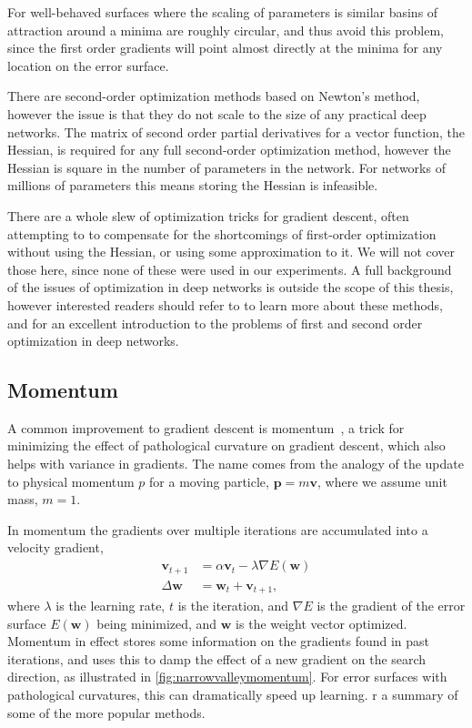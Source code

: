 \documentclass[thesis]{subfiles}
\begin{document}
For well-behaved surfaces where the scaling of parameters is similar
basins of attraction around a minima are roughly circular, and thus avoid this problem, since the first order gradients will point almost directly at the minima for any location on the error surface.

There are second-order optimization methods based on Newton's method, however the issue is that they do not scale to the size of any practical deep networks. The matrix of second order partial derivatives for a vector function, the Hessian, is required for any full second-order optimization method, however the Hessian is square in the number of parameters in the network. For networks of millions of parameters this means storing the Hessian is infeasible.

There are a whole slew of optimization tricks for gradient descent, often attempting to to compensate for the shortcomings of first-order optimization without using the Hessian, or using some approximation to it. We will not cover those here, since none of these were used in our experiments. A full background of the issues of optimization in deep networks is outside the scope of this thesis, however interested readers should refer to \citet{goodfellow2016deep} to learn more about these methods, and \citet{martens2010deep} for an excellent introduction to the problems of first and second order optimization in deep networks.

\subsection{Momentum}
A common improvement to gradient descent is momentum~\citep{polyak1964some,rumelhartbackprop}, a trick for minimizing the effect of pathological curvature on gradient descent, which also helps with variance in gradients. The name comes from the analogy of the update to physical momentum $p$ for a moving particle, $\mathbf{p}=m\mathbf{v}$, where we assume unit mass, $m=1$.

In momentum the gradients over multiple iterations are accumulated into a velocity gradient, 
\begin{equation}
\begin{aligned}
\mathbf{v}_{t+1} &= \alpha \mathbf{v}_t - \lambda\nabla E(\mathbf{w})\\
\Delta\mathbf{w} &= \mathbf{w}_t + \mathbf{v}_{t+1},
\end{aligned}
\end{equation}
where $\lambda$ is the learning rate, $t$ is the iteration, and $\nabla E$ is the gradient of the error surface $E(\mathbf{w})$ being minimized, and $\mathbf{w}$ is the weight vector optimized. Momentum in effect stores some information on the gradients found in past iterations, and uses this to damp the effect of a new gradient on the search direction, as illustrated in \cref{fig:narrowvalleymomentum}. For error surfaces with pathological curvatures, this can dramatically speed up learning.
r a summary of some of the more popular methods.
\end{document}

